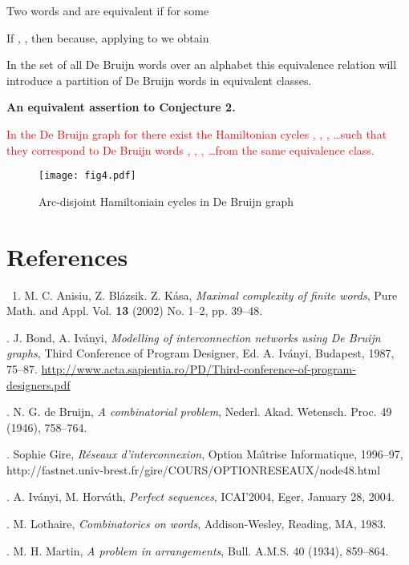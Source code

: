 \documentclass[10pt]{article}
\begin{document}
\medskip\noindent
Two words  and  are equivalent if  for some  

\medskip\noindent 
If , , then  because, applying  to  we obtain


\medskip\noindent
In the set of all De Bruijn words over an alphabet  this equivalence relation will introduce a partition of De Bruijn words in equivalent classes.


\medskip\noindent
\textbf{{An equivalent assertion to Conjecture 2.}}

\medskip\noindent\textcolor{red}{In the De Bruijn graph {} for {} there exist the Hamiltonian cycles  , , , \ldots  such that they correspond to De Bruijn words , , , \ldots  from the same equivalence class.}


\begin{figure}
\centering\texttt{[image: fig4.pdf]}
\caption{Arc-disjoint Hamiltoniain cycles in De Bruijn graph }
\end{figure}

\newpage\section*{References}
          
\quad\ 1. M. C. Anisiu, Z. Bl\'azsik. Z. K\'asa, \textit{Maximal complexity of finite words}, 
Pure Math. and Appl. Vol. \textbf{13} (2002) No. 1--2, pp. 39--48.

. J. Bond, A. Iv\'anyi,  \textit{Modelling of interconnection
networks using De Bruijn graphs}, Third Conference of Program Designer, 
Ed. A. Iv\'anyi, Budapest, 1987,  75--87. 
{\scriptsize \url{http://www.acta.sapientia.ro/PD/Third-conference-of-program-designers.pdf}}

. N. G. de Bruijn, \textit{A combinatorial problem}, 
Nederl. Akad. Wetensch. Proc. 49 (1946), 758--764.

. Sophie Gire, 
\emph{R\'eseaux d'interconnexion},  Option Ma\^{\i}trise Informatique, 1996--97,
{\scriptsize {http://fastnet.univ-brest.fr/gire/COURS/OPTIONRESEAUX/node48.html}}

. A. Iv\'anyi, M. Horv\'ath, \textit{Perfect sequences}, ICAI'2004, Eger, January 28, 2004.

. M. Lothaire, \textit{Combinatorics on words}, 
Addison-Wesley, Reading, MA, 1983.

. M. H. Martin, \textit{A problem in arrangements}, 
Bull. A.M.S. 40 (1934), 859--864.
\end{document}
